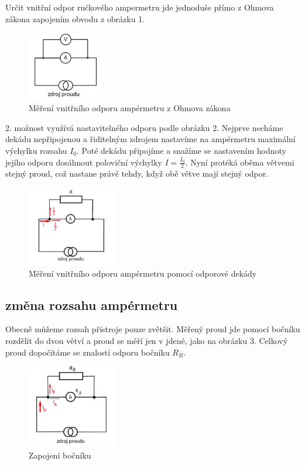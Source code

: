 \documentclass[a4paper,11pt]{article}
\begin{document}
Určit vnitřní odpor ručkového ampermetru jde jednoduše přímo z Ohmova zákona zapojením obvodu z obrázku 1.


\begin{figure}[htpb]
  \centering
  \includegraphics[width=0.3\textwidth]{mereni_voltmetrem.jpg}
  \caption{Měření vnitřního odporu ampérmetru z Ohmova zákona}
\end{figure}

2. možnost využívá nastavitelného odporu podle obrázku 2. 
Nejprve necháme dekádu nepřipojenou a řiditelným zdrojem nastavíme na ampérmetru
maximální výchylku rozsahu $I_0$. Poté dekádu připojíme a snažíme se nastavením hodnoty jejího odporu dosáhnout poloviční výchylky $I = \frac{I_0}{2}$. Nyní protéká oběma větvemi stejný proud, což nastane právě tehdy, když obě větve mají stejný odpor.

\begin{figure}[htpb]
  \centering
  \includegraphics[width=0.35\textwidth]{mereni_dekadou.jpg}
  \caption{Měření vnitřního odporu ampérmetru pomocí odporové dekády}
\end{figure}


\subsection{změna rozsahu ampérmetru}

Obecně můžeme rozsah přístroje pouze zvětšit. Měřený proud jde pomocí bočníku rozdělit do dvou větví a proud se měří jen v jdené, jako na obrázku 3. Celkový proud dopočítáme se znalostí odporu bočníku $R_B$.

\begin{figure}[htpb]
  \centering
  \includegraphics[width=0.35\textwidth]{bocnik.jpg}
  \caption{Zapojení bočníku}
\end{figure}
\end{document}

